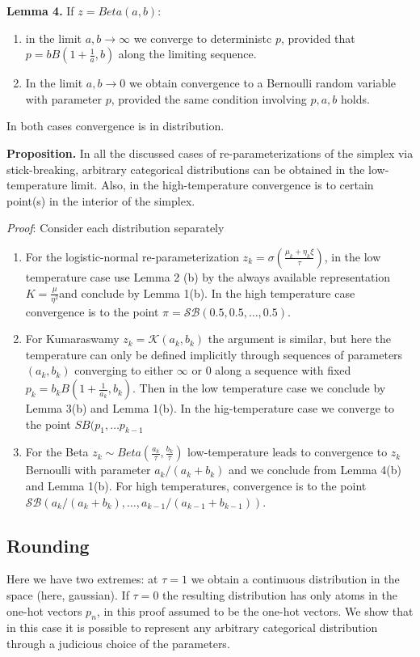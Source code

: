 \textbf{Lemma 4.} If $z=Beta(a,b)$: \begin{enumerate}
\item in the limit $a,b \rightarrow \infty $  we converge to deterministc $p$, provided that $p=bB\left(1+\frac{1}{a},b\right)$ along the limiting sequence.
\item In the limit $a,b\rightarrow 0$ we obtain convergence to a Bernoulli random variable with parameter $p$, provided the same condition involving $p,a,b$ holds. 
\end{enumerate}
In both cases convergence is in distribution.

\textbf{Proposition.} In all the discussed cases of re-parameterizations of the simplex via stick-breaking, arbitrary categorical distributions can be obtained in the low-temperature limit. Also, in the high-temperature convergence is to certain point(s) in the interior of the simplex.

\textit{Proof}: Consider each distribution separately
\begin{enumerate}
\item For the logistic-normal re-parameterization $z_k = \sigma\left( \frac{\mu_k+\eta_k\xi}{\tau}\right)$, in the low temperature case use Lemma 2 (b) by the always available representation  $K= \frac{\mu}{\eta^2}$and conclude by Lemma 1(b). In the high temperature case convergence is to the point $\pi = \mathcal{SB}(0.5,0.5,\ldots, 0.5)$.
\item For Kumaraswamy $z_k=\mathcal{K}(a_k,b_k)$ the argument is similar, but here the temperature can only be defined implicitly through sequences of parameters $(a_k,b_k)$ converging to either $\infty$ or 0 along a sequence with fixed $p_k=b_kB\left(1+\frac{1}{a_k},b_k\right)$. Then in the low temperature case we conclude by Lemma 3(b) and Lemma 1(b). In the hig-temperature case we converge to the point $SB(p_1,\ldots p_{k-1}$
\item For the Beta $z_k\sim Beta(\frac{a_k}{\tau},\frac{b_k}{\tau})$ low-temperature leads to convergence to $z_k$ Bernoulli with parameter $a_k/(a_k+b_k)$ and we conclude from Lemma 4(b) and Lemma 1(b). For high temperatures, convergence is to the point $\mathcal{SB}(a_k/(a_k+b_k),\ldots,a_{k-1}/(a_{k-1}+b_{k-1}))$.  \end{enumerate}


\subsection{Rounding}
Here we have two extremes: at $\tau =1$ we obtain a continuous distribution in the space (here, gaussian). If $\tau=0$ the resulting distribution has only atoms in the one-hot vectors $p_n$, in this proof assumed to be the one-hot vectors. We show that in this case it is possible to represent any arbitrary categorical distribution through a judicious choice of the parameters.


